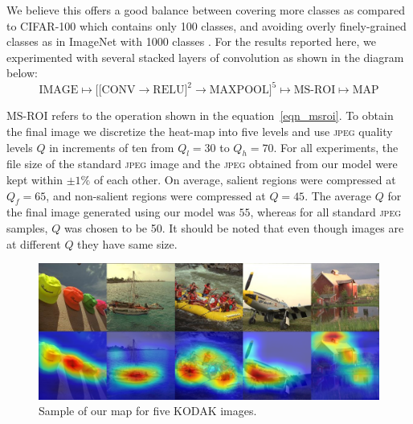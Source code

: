 We believe this offers a good balance between covering more classes as compared to CIFAR-100 which contains only 100 classes, and avoiding overly finely-grained classes as in ImageNet with 1000 classes \cite{imagenet_cvpr09}.
For the results reported here, we experimented with several stacked layers of convolution as shown in the diagram below:
\begin{equation*}
    \text{IMAGE} \longmapsto \bigg[ \big[ \text{CONV} \rightarrow \text{RELU}\big]^2 \rightarrow \text{MAXPOOL} \bigg]^5 \longmapsto \text{MS-ROI} \longmapsto \text{MAP}
\end{equation*}


$\text{MS-ROI}$ refers to the operation shown in the equation~\ref{eqn_msroi}.
To obtain the final image we discretize the heat-map into five levels and use \textsc{jpeg} quality levels $Q$ in increments of ten from $Q_l=30$ to $Q_h=70$.
For all experiments, the file size of the standard \textsc{jpeg} image and the \textsc{jpeg} obtained from our model were kept within $\pm1\%$ of each other.
On average, salient regions were compressed at $Q_f=65$, and non-salient regions were compressed at $Q=45$.
The average $Q$ for the final image generated using our model was $55$, whereas for all standard \textsc{jpeg} samples, $Q$ was chosen to be 50. It should be noted that even though images are at different $Q$ they have same size.

\begin{figure}[H]
    \centering
    \includegraphics[scale=0.37]{figures/semantic/all_images_small.png}
    \caption[Results on KODAK]{Sample of our map for five KODAK images.\label{fig_kodak_combo}}
\end{figure}

